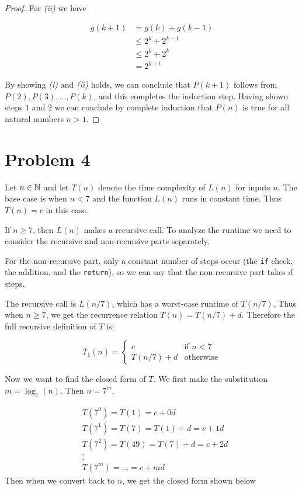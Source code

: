 \documentclass[12pt, a4paper]{amsart}
\theoremstyle{definition}
\theoremstyle{remark}
\numberwithin{Theorem}{section}
\begin{document}
\begin{proof}
    \newpage
    For \emph{(ii)} we have
    
    \begin{align*}
        g(k + 1) &= g(k) + g(k - 1) \\
        &\leqslant 2^k + 2^{k-1} \tag{by (1) and (2)} \\
        &\leqslant 2^k + 2^k \\
        &= 2^{k + 1}
    \end{align*}
    
    By showing \emph{(i)} and \emph{(ii)} holds, we can conclude
    that $P(k + 1)$ follows from $P(2), P(3), \dots, P(k)$, and this
    completes the induction step. Having shown steps $1$ and $2$
    we can conclude by complete induction
    that $P(n)$ is true for all natural numbers $n > 1$.
    
\end{proof}

\newpage


\section{Problem 4}

Let $n \in \mathbb N$ and let $T(n)$ denote the time complexity of $L(n)$
for inputs $n$. The base case is when $n < 7$ and the function
$L(n)$ runs in constant time. Thus $T(n) = c$ in this case.

If $n \geqslant 7$, then $L(n)$ makes a recursive call. To 
analyze the runtime we need to consider the recursive and 
non-recursive parts separately.

For the non-recursive part, only a constant number of steps occur 
(the \texttt{if} check, the addition, and the \texttt{return}), so
we can say that the non-recursive part takes $d$ steps.

The recursive call is $L(n/7)$, which has a worst-case runtime
of $T(n/7)$. Thus when $n \geqslant 7$, we get the recurrence 
relation $T(n) = T(n/7) + d$. Therefore the full recursive definition
of $T$ is:

\[ 
    T_1(n) = 
    \begin{cases} 
        c & \text{if $n < 7$} \\
        T(n/7) + d & \text{otherwise}
   \end{cases}
\]

Now we want to find the closed form of $T$. We first make the
substitution $m = \log_7(n)$. Then $n = 7^m$.

\begin{align*}
    &T(7^0) = T(1) = c + 0d \tag{m = 0} \\
    &T(7^1) = T(7) = T(1) + d = c + 1d \tag{m = 1} \\
    &T(7^2) = T(49) = T(7) + d = c + 2d \tag{m = 2} \\
    &\vdots \\
    &T(7^m) = \dots = c + md
\end{align*}
Then when we convert back to $n$, we get the closed form 
shown below
\end{document}
